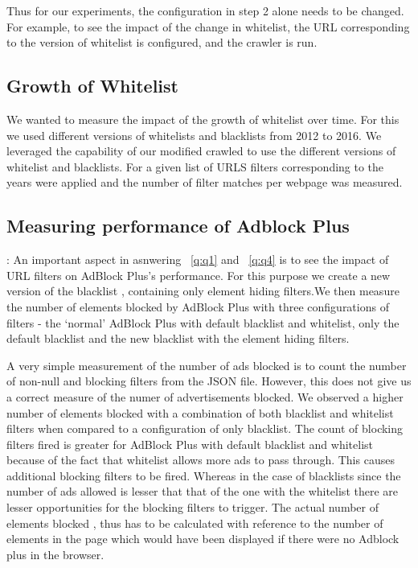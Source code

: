 Thus for our experiments, the configuration in step 2 alone needs to be changed. For example, to see the impact of the change in whitelist, the URL corresponding to the version of whitelist is configured, and the crawler is run.

\subsection{Growth of Whitelist}
We wanted to measure the impact of the growth of whitelist over time. For this we used different versions of whitelists and blacklists  from  2012 to 2016. We leveraged the capability of our modified crawled to  use the different versions of whitelist and blacklists. For a given list of URLS filters corresponding to the years were applied and the number of filter matches per webpage was measured.

\subsection{Measuring performance of Adblock Plus}:
An important aspect in asnwering ~\ref{q:q1} and ~\ref{q:q4} is to see the impact of URL filters on AdBlock Plus's performance. For this purpose we  create a new version of the blacklist , containing only element hiding filters.We then measure the number of elements blocked by AdBlock Plus with three configurations of filters - the ‘normal’ AdBlock Plus with default blacklist and whitelist, only the default blacklist and the new blacklist with the  element hiding filters.

A very simple measurement of the number of ads blocked is to count the number of non-null and blocking filters from the JSON file.
However, this does not give us a correct measure of the numer of advertisements blocked.
We observed a higher number of elements blocked with a combination of both blacklist and whitelist filters when compared to a configuration of only blacklist.
The count of blocking filters fired is greater for AdBlock Plus with default blacklist and whitelist because  of the fact that whitelist allows more ads to pass through. This causes additional blocking filters to be fired.
Whereas in the case of blacklists since the number of ads  allowed is lesser that that of the  one with the whitelist there are lesser opportunities for the blocking filters to trigger.
The actual number of elements blocked , thus has to be calculated  with reference to the number of elements in the page which would have been displayed  if there were no Adblock plus in the browser.


